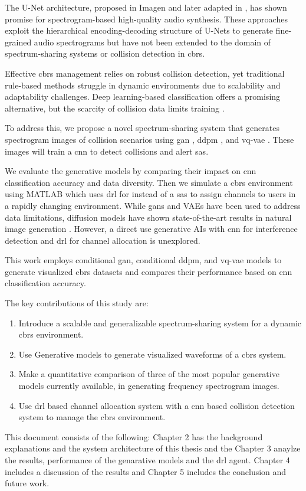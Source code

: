 The U-Net architecture, proposed in Imagen \cite{16} and later adapted in \cite{17}, has shown promise for spectrogram-based high-quality audio synthesis. These approaches exploit the hierarchical encoding-decoding structure of U-Nets to generate fine-grained audio spectrograms but have not been extended to the domain of spectrum-sharing systems or collision detection in \gls{cbrs}.

Effective \gls{cbrs} management relies on robust collision detection, yet traditional rule-based methods struggle in dynamic environments due to scalability and adaptability challenges. Deep learning-based classification offers a promising alternative, but the scarcity of collision data limits training \cite{5}.  

To address this, we propose a novel spectrum-sharing system that generates spectrogram images of collision scenarios using \gls{gan} \cite{6}, \gls{ddpm} \cite{7}, and \gls{vq-vae} \cite{8}. These images will train a \gls{cnn} to detect collisions and alert \gls{sas}. 

We evaluate the generative models by comparing their impact on \gls{cnn} classification accuracy and data diversity. Then we simulate a \gls {cbrs} environment using MATLAB which uses \gls{drl} for instead of a \gls{sas} to assign channels to users in a rapidly changing environment. While \gls{gan}s and VAEs have been used to address data limitations, diffusion models have shown state-of-the-art results in natural image generation \cite{9}. However, a direct use generative AIs with \gls{cnn} for interference detection and \gls{drl} for channel allocation is unexplored.  

This work employs conditional \gls{gan}, conditional \gls{ddpm}, and \gls{vq-vae} models to generate visualized \gls{cbrs} datasets and compares their performance based on \gls{cnn} classification accuracy.  

The key contributions of this study are:
\begin{enumerate}
    \item Introduce a scalable and generalizable spectrum-sharing system for a dynamic \gls{cbrs} environment.
    \item Use Generative models to generate visualized waveforms of a \gls{cbrs} system.
    \item Make a quantitative comparison of three of the most popular generative models currently available, in generating frequency spectrogram images.
    \item Use \gls{drl} based channel allocation system with a \gls{cnn} based collision detection system to manage the \gls{cbrs} environment.
\end{enumerate}


This document consists of the following: Chapter 2 has the background explanations and the system architecture of this thesis and the Chapter 3 anaylze the results, performance of the genarative models and the \gls{drl} agent. Chapter 4 includes a discussion of the results and Chapter 5 includes the conclusion and future work.

